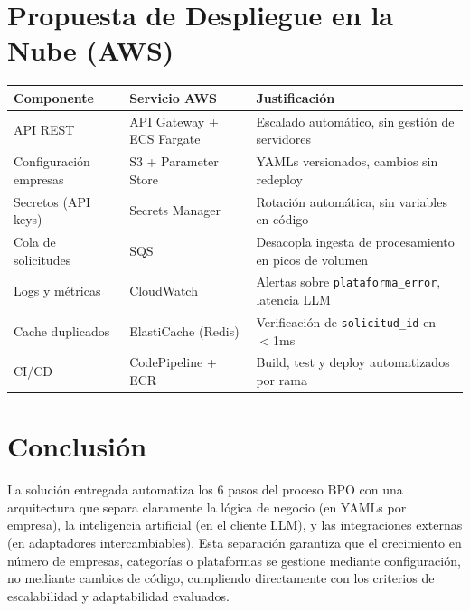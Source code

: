 \documentclass[9pt,letterpaper]{article}
\begin{document}
\section{Propuesta de Despliegue en la Nube (AWS)}

\begin{center}
\small
\begin{tabular}{@{}lll@{}}
\toprule
\textbf{Componente} & \textbf{Servicio AWS} & \textbf{Justificación} \\
\midrule
API REST & API Gateway + ECS Fargate & Escalado automático, sin gestión de servidores \\
Configuración empresas & S3 + Parameter Store & YAMLs versionados, cambios sin redeploy \\
Secretos (API keys) & Secrets Manager & Rotación automática, sin variables en código \\
Cola de solicitudes & SQS & Desacopla ingesta de procesamiento en picos de volumen \\
Logs y métricas & CloudWatch & Alertas sobre \texttt{plataforma\_error}, latencia LLM \\
Cache duplicados & ElastiCache (Redis) & Verificación de \texttt{solicitud\_id} en $<$1ms \\
CI/CD & CodePipeline + ECR & Build, test y deploy automatizados por rama \\
\bottomrule
\end{tabular}
\end{center}



\section{Conclusión}

La solución entregada automatiza los 6 pasos del proceso BPO con una arquitectura que separa claramente la lógica de negocio (en YAMLs por empresa), la inteligencia artificial (en el cliente LLM), y las integraciones externas (en adaptadores intercambiables). Esta separación garantiza que el crecimiento en número de empresas, categorías o plataformas se gestione mediante configuración, no mediante cambios de código, cumpliendo directamente con los criterios de escalabilidad y adaptabilidad evaluados.
\end{document}
